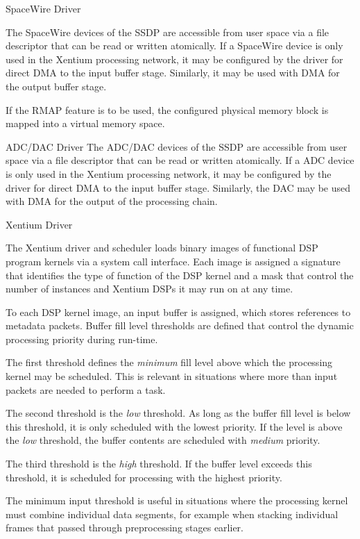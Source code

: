 %
{\gls{SpaceWire} Driver}{%
The \gls{SpaceWire} devices of the \gls{SSDP} are accessible from user space via
a file descriptor that can be read or written atomically.
If a \gls{SpaceWire} device is only used in the \gls{Xentium} processing
network, it may be configured by the driver for direct \gls{DMA} to the input
buffer stage. Similarly, it may be used with \gls{DMA} for the output buffer
stage.

If the \gls{RMAP} feature is to be used, the configured physical memory block
is mapped into a virtual memory space.
}%
{}{}


%
{\gls{ADC}/\gls{DAC} Driver}{%
The \gls{ADC}/\gls{DAC} devices of the \gls{SSDP} are accessible from user
space via a file descriptor that can be read or written atomically.
If a \gls{ADC} device is only used in the \gls{Xentium} processing
network, it may be configured by the driver for direct \gls{DMA} to the input
buffer stage. Similarly, the \gls{DAC} may be used with \gls{DMA} for the
output of the processing chain.
}%
{}{}


%
{Xentium Driver}{%
The \gls{Xentium} driver and scheduler loads binary images of functional
\gls{DSP} program kernels via a system call interface. Each image is assigned a
signature that identifies the type of function of the \gls{DSP} kernel and a
mask that control the number of instances and \gls{Xentium} \glspl{DSP} it
may run on at any time. \newline

To each \gls{DSP} kernel image, an input buffer is assigned, which stores
references to metadata packets. Buffer fill level thresholds are defined that
control the dynamic processing priority during run-time. \newline

The first threshold defines the \emph{minimum} fill level above which the
processing kernel may be scheduled. This is relevant in situations where more
than input packets are needed to perform a task. \newline

The second threshold is the \emph{low} threshold.
As long as the buffer fill level is below this threshold, it is only scheduled
with the lowest priority. If the level is above the \emph{low} threshold, the
buffer contents are scheduled with \emph{medium} priority. \newline

The third threshold is the \emph{high} threshold. If the buffer level exceeds
this threshold, it is scheduled for processing with the highest priority.
}%
{}{%
The minimum input threshold is useful in situations where the processing kernel
must combine individual data segments, for example when stacking individual
frames that passed through preprocessing stages earlier.
}


